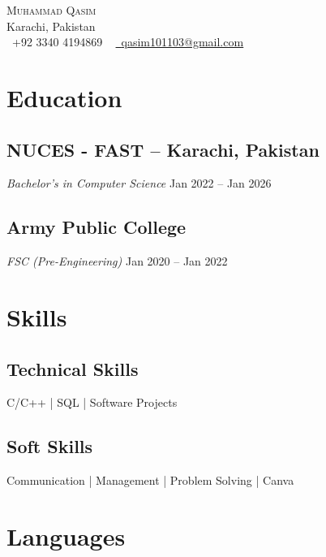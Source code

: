\documentclass[letterpaper,11pt]{article}
\begin{document}
  
  
\begin{center}
    {\Huge \scshape Muhammad Qasim} \\ \vspace{1pt}
    Karachi, Pakistan \\ \vspace{1pt}
    \small \raisebox{-0.1\height}\faPhone\ +92 3340 4194869 ~ \href{mailto:qasim101103@gmail.com}{\raisebox{-0.2\height}\faEnvelope\  \underline{qasim101103@gmail.com}}
    \vspace{-8pt}
\end{center}


  \section{Education}
  
\subsection*{NUCES - FAST -- Karachi, Pakistan}
\textit{Bachelor's in Computer Science} \hfill Jan 2022 -- Jan 2026




\subsection*{Army Public College}
\textit{FSC (Pre-Engineering)} \hfill Jan 2020 -- Jan 2022




  \section{Skills}
  
  \subsection*{Technical Skills}
  
  C/C++ | SQL | Software Projects


  \subsection*{Soft Skills}
  
  Communication | Management | Problem Solving | Canva


  \section{Languages}
\end{document}
